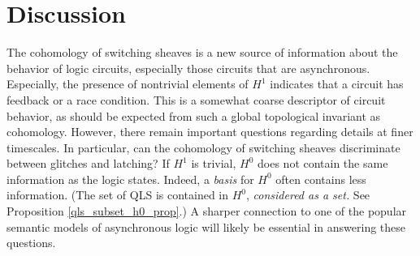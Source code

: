\documentclass{amsart}
\theoremstyle{plain}
\theoremstyle{definition}
\begin{document}
\section{Discussion}
\label{discussion_sec}

The cohomology of switching sheaves is a new source of information
about the behavior of logic circuits, especially those circuits that
are asynchronous.  Especially, the presence of nontrivial elements of
$H^1$ indicates that a circuit has feedback or a race condition.  This
is a somewhat coarse descriptor of circuit behavior, as should be
expected from such a global topological invariant as cohomology.
However, there remain important questions regarding details at finer
timescales.  In particular, can the cohomology of switching sheaves
discriminate between glitches and latching?  If $H^1$ is trivial,
$H^0$ does not contain the same information as the logic states.
Indeed, a {\it basis} for $H^0$ often contains less information.  (The
set of QLS is contained in $H^0$, {\it considered as a set.}  See
Proposition \ref{qls_subset_h0_prop}.)  A sharper
connection to one of the popular semantic models of asynchronous logic
will likely be essential in answering these questions.



\end{document}

